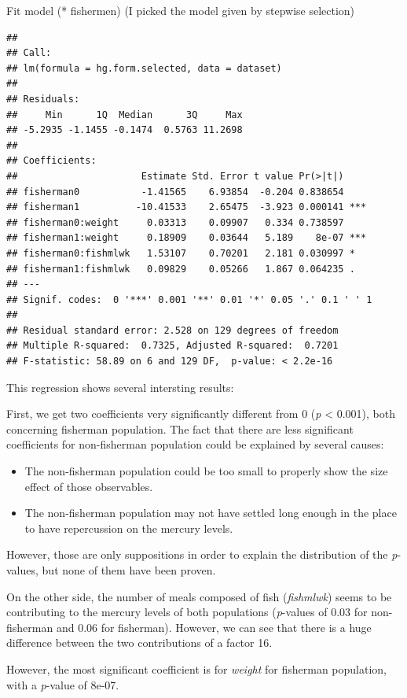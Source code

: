 \documentclass[12pt,]{article}
\providecommand{\tightlist}{%
  \setlength{\itemsep}{0pt}\setlength{\parskip}{0pt}}
\begin{document}
Fit model (* fishermen) (I picked the model given by stepwise selection)

\begin{verbatim}
## 
## Call:
## lm(formula = hg.form.selected, data = dataset)
## 
## Residuals:
##     Min      1Q  Median      3Q     Max 
## -5.2935 -1.1455 -0.1474  0.5763 11.2698 
## 
## Coefficients:
##                      Estimate Std. Error t value Pr(>|t|)    
## fisherman0           -1.41565    6.93854  -0.204 0.838654    
## fisherman1          -10.41533    2.65475  -3.923 0.000141 ***
## fisherman0:weight     0.03313    0.09907   0.334 0.738597    
## fisherman1:weight     0.18909    0.03644   5.189    8e-07 ***
## fisherman0:fishmlwk   1.53107    0.70201   2.181 0.030997 *  
## fisherman1:fishmlwk   0.09829    0.05266   1.867 0.064235 .  
## ---
## Signif. codes:  0 '***' 0.001 '**' 0.01 '*' 0.05 '.' 0.1 ' ' 1
## 
## Residual standard error: 2.528 on 129 degrees of freedom
## Multiple R-squared:  0.7325, Adjusted R-squared:  0.7201 
## F-statistic: 58.89 on 6 and 129 DF,  p-value: < 2.2e-16
\end{verbatim}

This regression shows several intersting results:

First, we get two coefficients very significantly different from 0
(\emph{p} \textless{} 0.001), both concerning fisherman population. The
fact that there are less significant coefficients for non-fisherman
population could be explained by several causes:

\begin{itemize}
\tightlist
\item
  The non-fisherman population could be too small to properly show the
  size effect of those observables.
\item
  The non-fisherman population may not have settled long enough in the
  place to have repercussion on the mercury levels.
\end{itemize}

However, those are only suppositions in order to explain the
distribution of the \emph{p}-values, but none of them have been proven.

On the other side, the number of meals composed of fish
(\emph{fishmlwk}) seems to be contributing to the mercury levels of both
populations (\emph{p}-values of 0.03 for non-fisherman and 0.06 for
fisherman). However, we can see that there is a huge difference between
the two contributions of a factor 16.

However, the most significant coefficient is for \emph{weight} for
fisherman population, with a \emph{p}-value of 8e-07.
\end{document}
